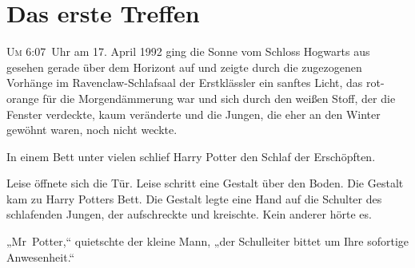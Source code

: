 
\section{Das erste Treffen}

\lettrine{U}{m} 6:07~Uhr am 17. April 1992 ging die Sonne vom Schloss Hogwarts aus gesehen gerade über dem Horizont auf und zeigte durch die zugezogenen Vorhänge im Ravenclaw-Schlafsaal der Erstklässler ein sanftes Licht, das rot-orange für die Morgendämmerung war und sich durch den weißen Stoff, der die Fenster verdeckte, kaum veränderte und die Jungen, die eher an den Winter gewöhnt waren, noch nicht weckte.

In einem Bett unter vielen schlief Harry Potter den Schlaf der Erschöpften.





Leise öffnete sich die Tür. Leise schritt eine Gestalt über den Boden. Die Gestalt kam zu Harry Potters Bett. Die Gestalt legte eine Hand auf die Schulter des schlafenden Jungen, der aufschreckte und kreischte. Kein anderer hörte es.

„Mr~Potter,“ quietschte der kleine Mann, „der Schulleiter bittet um Ihre sofortige Anwesenheit.“

